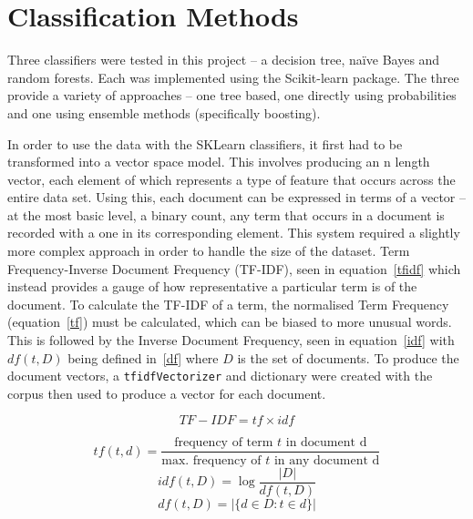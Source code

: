 \documentclass[11pt]{article}
\begin{document}
\section{Classification Methods}

Three classifiers were tested in this project – a decision tree, naïve Bayes and random forests. Each was implemented using the Scikit-learn package. The three provide a variety of approaches – one tree based, one directly using probabilities and one using ensemble methods (specifically boosting).

In order to use the data with the SKLearn classifiers, it first had to be transformed into a vector space model. This involves producing an n length vector, each element of which represents a type of feature that occurs across the entire data set. Using this, each document can be expressed in terms of a vector – at the most basic level, a binary count, any term that occurs in a document is recorded with a one in its corresponding element. This system required a slightly more complex approach in order to handle the size of the dataset. Term Frequency-Inverse Document Frequency (TF-IDF), seen in equation~\ref{tfidf} which instead provides a gauge of how representative a particular term is of the document.  To calculate the TF-IDF of a term, the normalised Term Frequency (equation~\ref{tf}) must be calculated, which can be biased to more unusual words. This is followed by the Inverse Document Frequency, seen in equation~\ref{idf} with $df(t, D)$ being defined in~\ref{df} where $D$ is the set of documents. To produce the document vectors, a \texttt{tfidfVectorizer} and dictionary were created with the corpus then used to produce a vector for each document.

\begin{equation}
\label{tfidf}
TF-IDF = tf \times idf
\end{equation}

\begin{equation}
\label{tf}
tf(t,d) = \frac{\text{frequency of term } t \text{ in document d}}{\text{max. frequency of } t \text{ in any document d}}
\end{equation}
\begin{equation}
\label{idf}
idf(t,D) = \log\frac{\left\vert{D}\right\vert}{df(t, D)}
\end{equation}
\begin{equation}
\label{df}
df(t,D) = \left\vert\{d \in D: t \in d\}\right\vert
\end{equation}
\end{document}

